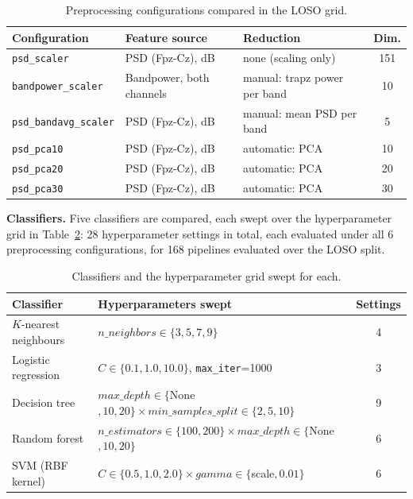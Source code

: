 \documentclass[11pt,a4paper]{article}
\newcommand{\num}[1]{#1}
\begin{document}
\begin{table}[htbp]
  \centering
  \caption{Preprocessing configurations compared in the LOSO grid.}
  \label{tab:preprocconfig}
  \begin{tabular}{lllc}
    \toprule
    Configuration & Feature source & Reduction & Dim. \\
    \midrule
    \texttt{psd\_scaler} & PSD (Fpz-Cz), dB & none (scaling only) & 151 \\
    \texttt{bandpower\_scaler} & Bandpower, both channels & manual: trapz power per band & 10 \\
    \texttt{psd\_bandavg\_scaler} & PSD (Fpz-Cz), dB & manual: mean PSD per band & 5 \\
    \texttt{psd\_pca10} & PSD (Fpz-Cz), dB & automatic: PCA & 10 \\
    \texttt{psd\_pca20} & PSD (Fpz-Cz), dB & automatic: PCA & 20 \\
    \texttt{psd\_pca30} & PSD (Fpz-Cz), dB & automatic: PCA & 30 \\
    \bottomrule
  \end{tabular}
\end{table}


\textbf{Classifiers.} Five classifiers are compared, each swept over the hyperparameter grid in
Table~\ref{tab:classifiers}: \num{28} hyperparameter settings in total, each evaluated under all
6 preprocessing configurations, for \num{168} pipelines evaluated over the LOSO split.

\begin{table}[htbp]
  \centering
  \caption{Classifiers and the hyperparameter grid swept for each.}
  \label{tab:classifiers}
  \begin{tabular}{llc}
    \toprule
    Classifier & Hyperparameters swept & Settings \\
    \midrule
    $K$-nearest neighbours & $n\_neighbors \in \{3,5,7,9\}$ & 4 \\
    Logistic regression & $C \in \{0.1, 1.0, 10.0\}$, \texttt{max\_iter}=1000 & 3 \\
    Decision tree & $max\_depth \in \{$None$,10,20\} \times min\_samples\_split \in \{2,5,10\}$ & 9 \\
    Random forest & $n\_estimators \in \{100,200\} \times max\_depth \in \{$None$,10,20\}$ & 6 \\
    SVM (RBF kernel) & $C \in \{0.5,1.0,2.0\} \times gamma \in \{$scale$,0.01\}$ & 6 \\
    \bottomrule
  \end{tabular}
\end{table}
\end{document}
